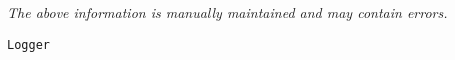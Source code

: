 \label{pkg:logger}

{\tiny \it The above information is manually maintained and may contain errors.}
\begin{verbatim}
Logger
\end{verbatim}
